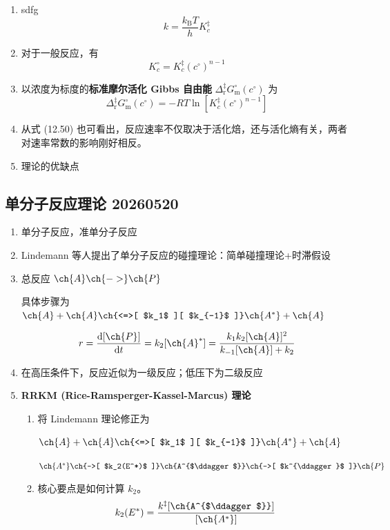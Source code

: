\begin{enumerate}
    \item sdfg
    \begin{equation}
        k = \frac{k_{\mathrm{B}} T}{h} K_c^{\ddagger}
    \end{equation}
    \item 对于一般反应，有
    \begin{equation}
        K_c^{\circ} = K_c^{\ddagger}\left(c^{\circ}\right)^{n-1}
    \end{equation}
    \item 以浓度为标度的\textbf{标准摩尔活化 Gibbs 自由能} $\Delta_{\mathrm{r}}^{\ddagger}G_{\mathrm{m}}^{\circ}\left(c^{\circ}\right)$ 为
    \begin{equation*}
        \Delta_{\mathrm{r}}^{\ddagger}G_{\mathrm{m}}^{\circ}\left(c^{\circ}\right) = -RT\ln\left[ K_c^{\ddagger}\left(c^{\circ}\right)^{n-1}\right]
    \end{equation*}
    \item 从式 (12.50) 也可看出，反应速率不仅取决于活化焙，还与活化熵有关，两者对速率常数的影响刚好相反。
    \item 理论的优缺点
\end{enumerate}

\subsection{单分子反应理论 20260520}

\begin{enumerate}
    \item 单分子反应，准单分子反应
    \item Lindemann 等人提出了单分子反应的碰撞理论：简单碰撞理论+时滞假设
    \item 总反应 $\ch{A} \ch{->} \ch{P}$

    具体步骤为 $\ch{A} + \ch{A} \ch{<=>[ $k_1$ ][ $k_{-1}$ ]} \ch{A^*} + \ch{A}$
    
    \begin{equation}
        r = \frac{\mathrm{d}[\ch{P}]}{\mathrm{d}t} = k_2 [\ch{A}^*] = \frac{k_1 k_2 [\ch{A}]^2}{k_{-1}[\ch{A}] + k_2}
    \end{equation}
    \item 在高压条件下，反应近似为一级反应；低压下为二级反应
    \item \textbf{RRKM (Rice-Ramsperger-Kassel-Marcus) 理论}
    \begin{enumerate}
        \item 将 Lindemann 理论修正为
        
            $\ch{A} + \ch{A} \ch{<=>[ $k_1$ ][ $k_{-1}$ ]} \ch{A^*} + \ch{A}$

            $\ch{A^*} \ch{->[ $k_2(E^*)$ ]} \ch{A^{$\ddagger$}} \ch{->[ $k^{\ddagger}$ ]} \ch{P}$
        \item 核心要点是如何计算 $k_2$。
        \begin{equation}
            k_2(E^*) = \frac{k^{\ddagger}[\ch{A^{$\ddagger$}}]}{[\ch{A^*}]}
        \end{equation}
    \end{enumerate}
\end{enumerate}

